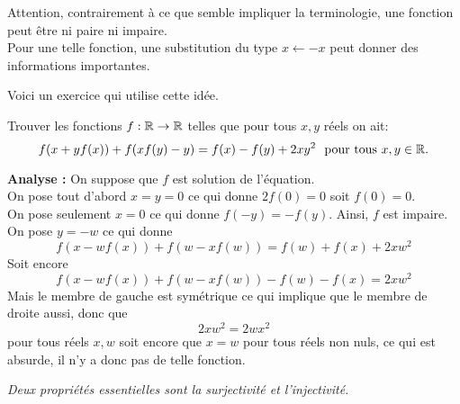 \begin{rem}
Attention, contrairement à ce que semble impliquer la terminologie, une fonction peut être ni paire ni impaire.
\\
Pour une telle fonction, une substitution du type $x\gets-x$ peut donner des informations importantes.
\end{rem}

Voici un exercice qui utilise cette idée.



\begin{exo}[M]
Trouver les fonctions $f:\mathbb R\to \mathbb R$ telles que pour tous $x,y$ réels on ait:
$$f(x+yf(x)) +f(xf(y)-y) = f(x)-f(y)+2xy^2 \ \text{ pour tous } x, y \in \mathbb R.$$
\end{exo}
\begin{preuve}
\textbf{Analyse :} On suppose que $f$ est solution de l'équation.
\\
On pose tout d'abord $x=y=0$
ce qui donne $2f(0)=0$ soit $f(0)=0$.
\\
On pose seulement $x=0$ ce qui donne $f(-y)=-f(y)$. Ainsi, $f$ est impaire.
\\
On pose $y=-w$ ce qui donne $$f(x-wf(x))+f(w-xf(w))=f(w)+f(x)+2xw^2$$
Soit encore $$f(x-wf(x))+f(w-xf(w))-f(w)-f(x)=2xw^2$$
Mais le membre de gauche est symétrique ce qui implique que le membre de droite aussi, donc que $$2xw^2=2wx^2$$ pour tous réels $x,w$ soit encore que $x=w$ pour tous réels non nuls, ce qui est absurde, il n'y a donc pas de telle fonction. 
\end{preuve}

\emph{Deux propriétés essentielles sont la surjectivité et l'injectivité.}

